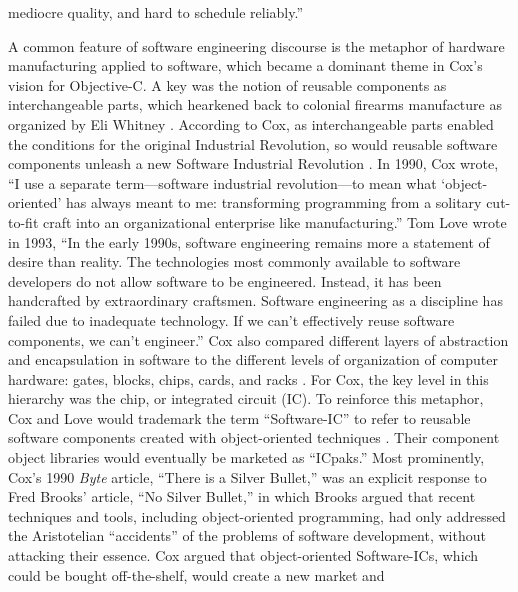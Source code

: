 \documentclass[acmsmall,screen]{acmart}
\begin{document}
mediocre quality, and hard to schedule reliably.'' \citep[307]{ledbetter_software-ics:_1985} 

A common feature of software engineering discourse is the metaphor of hardware manufacturing applied to software, which became a dominant theme in Cox's vision for Objective-C. A key was the notion of reusable components as interchangeable parts, which hearkened back to colonial firearms manufacture as organized by Eli Whitney \citetext{\citealp[26]{cox_planning_1990}; \citealp[214]{cox_there_1990}; \citealp[1]{cox_object-oriented_1986}; \citealp[1]{cox_object-oriented_1991}}. According to Cox, as interchangeable parts enabled the conditions for the original Industrial Revolution, so would reusable software components unleash a new Software Industrial Revolution \citetext{\citealp{cox_planning_1990}; \citealp[214]{cox_there_1990}}. In 1990, Cox wrote, ``I use a separate term---software industrial revolution---to mean what `object-oriented' has always meant to me: transforming programming from a solitary cut-to-fit craft into an organizational enterprise like manufacturing.'' \citep[27]{cox_planning_1990} Tom Love wrote in 1993, ``In the early 1990s, software engineering remains more a statement of desire than reality. The technologies most commonly available to software developers do not allow software to be engineered. Instead, it has been handcrafted by extraordinary craftsmen.\textellipsis{} Software engineering as a discipline has failed due to inadequate technology. If we can't effectively reuse software components, we can't engineer.'' \citep[21]{love_object_1995} Cox also compared different layers of abstraction and encapsulation in software to the different levels of organization of computer hardware: gates, blocks, chips, cards, and racks \citetext{\citealp[29]{cox_planning_1990}; \citealp[212]{cox_there_1990}; \citealp[50]{cox_object-oriented_1991}}.  For Cox, the key level in this hierarchy was the chip, or integrated circuit (IC). To reinforce this metaphor, Cox and Love would trademark the term ``Software-IC'' to refer to reusable software components created with object-oriented techniques \citetext{\citealp[166]{cox_objective-c_1988}; \citealp[331]{cox_planning_1989}; \citealp[2, 9, 19, 26, 53, 68, 70, 78, 88, 91, 96, 104, 156, 215]{cox_object-oriented_1986}; \citealp[19--20, 26--28, 69, 74--75, 90--92, 118, 174, 217]{cox_object-oriented_1991}; \citealp{cox_objects_1986}; \citealp{ledbetter_software-ics:_1985}; \citealp[240--41]{love_economics_1988}}. Their component object libraries would eventually be marketed as ``ICpaks.'' \citetext{\citealp[166, 168]{cox_objective-c_1988}; \citealp[174, 179, 181, 185, 188, 194]{cox_object-oriented_1991}; \citealp[239--41]{love_economics_1988}} Most prominently, Cox's 1990 \emph{Byte} article, ``There is a Silver Bullet,'' \citep{cox_there_1990} was an explicit response to Fred Brooks' \citeyear{brooks_no_1987} article, ``No Silver Bullet,'' in which Brooks argued that recent techniques and tools, including object-oriented programming, had only addressed the Aristotelian ``accidents'' of the problems of software development, without attacking their essence. Cox argued that object-oriented Software-ICs, which could be bought off-the-shelf, would create a new market and 
\end{document}
